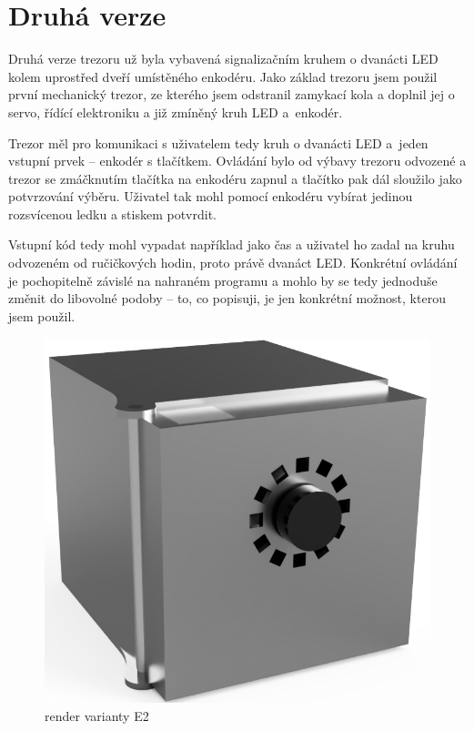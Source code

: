 \section{Druhá verze}


Druhá verze trezoru už byla vybavená signalizačním kruhem o dvanácti LED kolem uprostřed dveří
umístěného enkodéru. Jako základ trezoru jsem použil první mechanický trezor, %
 ze kterého jsem odstranil zamykací kola 
a doplnil jej o servo, řídící elektroniku a již zmíněný kruh LED a~enkodér.

Trezor měl pro komunikaci s uživatelem tedy kruh o dvanácti LED a~jeden vstupní prvek -- enkodér s tlačítkem.
Ovládání bylo od výbavy trezoru odvozené a trezor se zmáčknutím tlačítka na enkodéru zapnul a tlačítko pak dál sloužilo jako potvrzování výběru.
Uživatel tak mohl pomocí enkodéru vybírat jedinou rozsvícenou ledku a stiskem potvrdit. 

Vstupní kód tedy mohl vypadat 
například jako čas a uživatel ho zadal na kruhu odvozeném od ručičkových hodin, proto právě dvanáct LED.
Konkrétní ovládání je pochopitelně závislé na nahraném programu a mohlo by se tedy jednoduše změnit do libovolné podoby --
to, co popisuji, je jen konkrétní možnost, kterou jsem použil.

\begin{figure}[htbp]
    \centering
    \includegraphics[width=\textwidth]{kapitoly/obrazky/E2/predni_render.png}
    \caption{render varianty E2}
    \label{fig:E2-render}
\end{figure}

\newpage